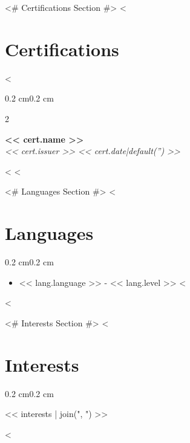 \documentclass[10pt, letterpaper]{article}
\newenvironment{highlights}{%
    \begin{itemize}[
        topsep=0.10 cm,%
        parsep=0.10 cm,%
        partopsep=0pt,%
        itemsep=0pt,%
        leftmargin=0.4 cm + 10pt%
    ]
}{%
    \end{itemize}%
}
\newenvironment{onecolentry}{%
    \begin{adjustwidth}{0.2 cm}{0.2 cm}%
}{%
    \end{adjustwidth}%
}
\newenvironment{twocolentry}[2][]{%
    \begin{onecolentry}%
    \def\secondColumn{#2}%
    \begin{paracol}{2}%
}{%
    \switchcolumn%
    \raggedleft%
    \secondColumn%
    \end{paracol}%
    \end{onecolentry}%
}
\begin{document}
<# Certifications Section #>
<%
\section{Certifications}
<%
\begin{twocolentry}{\textit{ << cert.date|default('') >> }}
    \textbf{ << cert.name >> }\\
    \textit{ << cert.issuer >> }
\end{twocolentry}
\vspace{0.10 cm}
<%
<%

<# Languages Section #>
<%
\section{Languages}
\begin{onecolentry}
    \begin{highlights}
    <%
        \item << lang.language >> - << lang.level >>
    <%
    \end{highlights}
\end{onecolentry}
<%

<# Interests Section #>
<%
\section{Interests}
\begin{onecolentry}
    << interests | join(", ") >>
\end{onecolentry}
<%
\end{document}
